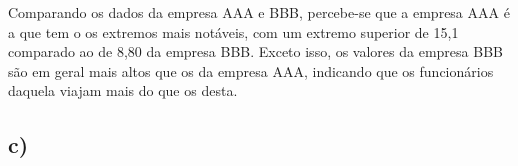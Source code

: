 \documentclass[11pt]{article}
\begin{document}
Comparando os dados da empresa AAA e BBB, percebe-se que a empresa AAA é a que tem o os extremos mais notáveis, com um extremo superior de 15,1 comparado ao de 8,80 da empresa BBB. Exceto isso, os valores da empresa BBB são em geral mais altos que os da empresa AAA, indicando que os funcionários daquela viajam mais do que os desta.

\subsection*{c)}
\label{sec:orgfda4561}
\end{document}
